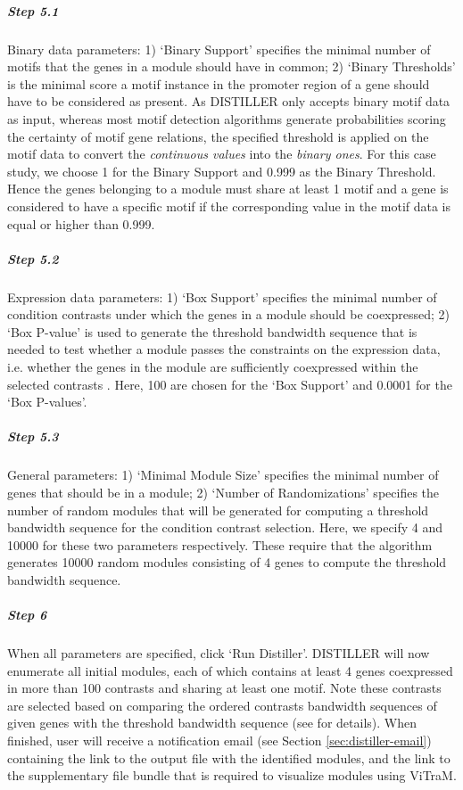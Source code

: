 \begin{small}
\subparagraph{Step 5.1} Binary data parameters: 1) `Binary Support' specifies 
the minimal number of motifs that the genes in a module should have in common;
2) `Binary Thresholds' is the minimal score a motif instance in the promoter
region of a gene should have to be considered as present.  
%
As DISTILLER only accepts binary motif data as input, whereas most motif
detection algorithms generate probabilities scoring the certainty of motif
gene relations, the specified threshold is applied on the motif data to
convert the \textit{continuous values} into the \textit{binary ones}.
%
For this case study, we choose 1 for the Binary Support and 
0.999 as the Binary Threshold. Hence the genes belonging to a module must share 
at least 1 motif and a gene is considered to have a specific motif if the 
corresponding value in the motif data is equal or higher than 0.999.

\subparagraph{Step 5.2}	Expression data parameters: 1) `Box Support' specifies 
the minimal number of condition contrasts under which the genes in a module
should be coexpressed; 2) `Box P-value' is used to generate the threshold
bandwidth sequence that is needed to test whether a module passes the
constraints on the expression data, i.e. whether the genes in the module are
sufficiently coexpressed within the selected contrasts \cite{Lemmens2009}.
Here, 100 are chosen for the `Box Support' and 0.0001 for the `Box P-values'.

\subparagraph{Step 5.3} General parameters: 1) `Minimal Module Size' specifies 
the minimal number of genes that should be in a module; 2) `Number of
Randomizations' specifies the number of random modules that will be generated
for computing a threshold bandwidth sequence for the condition contrast
selection.  Here, we specify 4 and 10000 for these two parameters
respectively.
These require that the algorithm generates 10000 random modules consisting of
4 genes to compute the threshold bandwidth sequence.

\subparagraph{Step 6} When all parameters are specified, click `Run 
Distiller'. DISTILLER will now enumerate all initial modules, each of which
contains at least 4 genes coexpressed in more than 100 contrasts and sharing
at least one motif. Note these contrasts are selected based on comparing the
ordered contrasts bandwidth sequences of given genes with the threshold
bandwidth sequence (see \cite{Lemmens2009} for details).
%
When finished, user will receive a notification email (see Section 
\ref{sec:distiller-email}) containing the link to the output file with the
identified modules, and the link to the supplementary file bundle that is 
required to visualize modules using ViTraM.

\end{small} %


